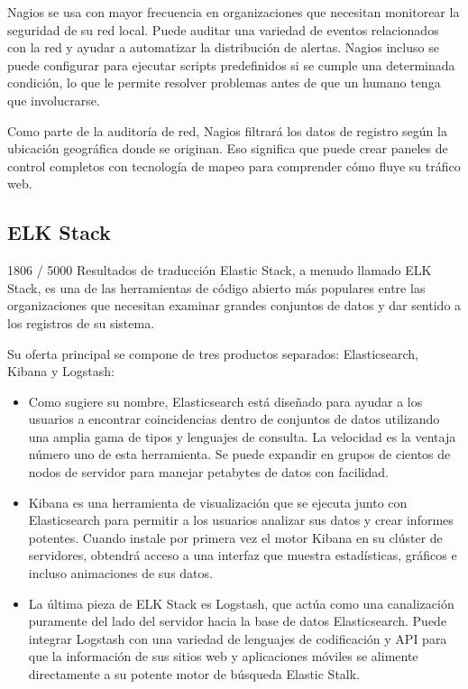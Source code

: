Nagios se usa con mayor frecuencia en organizaciones que necesitan monitorear la seguridad de su red local. Puede auditar una variedad de eventos relacionados con la red y ayudar a automatizar la distribución de alertas. Nagios incluso se puede configurar para ejecutar scripts predefinidos si se cumple una determinada condición, lo que le permite resolver problemas antes de que un humano tenga que involucrarse.

Como parte de la auditoría de red, Nagios filtrará los datos de registro según la ubicación geográfica donde se originan. Eso significa que puede crear paneles de control completos con tecnología de mapeo para comprender cómo fluye su tráfico web.

\subsection{ELK Stack}

1806 / 5000
Resultados de traducción
Elastic Stack, a menudo llamado ELK Stack, es una de las herramientas de código abierto más populares entre las organizaciones que necesitan examinar grandes conjuntos de datos y dar sentido a los registros de su sistema.

Su oferta principal se compone de tres productos separados: Elasticsearch, Kibana y Logstash:

\begin{itemize}

\item Como sugiere su nombre, Elasticsearch está diseñado para ayudar a los usuarios a encontrar coincidencias dentro de conjuntos de datos utilizando una amplia gama de tipos y lenguajes de consulta. La velocidad es la ventaja número uno de esta herramienta. Se puede expandir en grupos de cientos de nodos de servidor para manejar petabytes de datos con facilidad.

\item Kibana es una herramienta de visualización que se ejecuta junto con Elasticsearch para permitir a los usuarios analizar sus datos y crear informes potentes. Cuando instale por primera vez el motor Kibana en su clúster de servidores, obtendrá acceso a una interfaz que muestra estadísticas, gráficos e incluso animaciones de sus datos.

\item La última pieza de ELK Stack es Logstash, que actúa como una canalización puramente del lado del servidor hacia la base de datos Elasticsearch. Puede integrar Logstash con una variedad de lenguajes de codificación y API para que la información de sus sitios web y aplicaciones móviles se alimente directamente a su potente motor de búsqueda Elastic Stalk.

\end{itemize}

